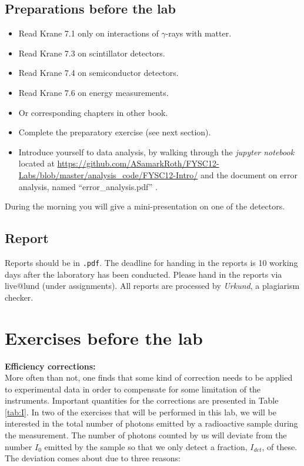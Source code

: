 \documentclass[12pt]{article}
\begin{document}
\subsection*{Preparations before the lab}
\begin{itemize}
  \item Read Krane 7.1 only on interactions of $\gamma$-rays with matter. %
  \item Read Krane 7.3 on scintillator detectors.
  \item Read Krane 7.4 on semiconductor detectors.
  \item Read Krane 7.6 on energy measurements.
  \item Or corresponding chapters in other book.
  \item Complete the preparatory exercise (see next section).
  \item Introduce yourself to data analysis, by walking through the {\it jupyter notebook} located at   \url{https://github.com/ASamarkRoth/FYSC12-Labs/blob/master/analysis_code/FYSC12-Intro/} and the document on error analysis, named ``error\_analysis.pdf'' .

\end{itemize}
During the morning you will give a mini-presentation on one of the detectors.

\subsection*{Report}
Reports should be in \texttt{.pdf}. The deadline for handing in the
reports is 10 working days after the laboratory has been conducted.
Please hand in the reports via live@lund (under assignments).
All reports are processed by \textit{Urkund}, a plagiarism checker.


\section*{Exercises before the lab} \label{sec:exe}

{\bf\small Efficiency corrections:}\\
More often than not, one finds that some kind of correction needs to
be applied to experimental data in order to compensate for some
limitation of the instruments. Important quantities for the corrections are presented in Table \ref{tab:I}. In two of the exercises that will be
performed in this lab, we will be interested in the total number of
photons emitted by a radioactive sample during the measurement.  The
number of photons counted by us will deviate from the number $I_0$
emitted by the sample so that we only detect a fraction, $I_{det}$, of
these. The deviation comes about due to three reasons:
\end{document}
